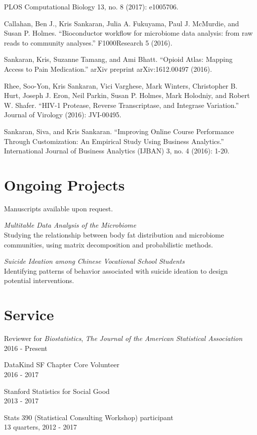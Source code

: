 \documentclass[letterpaper]{article}
\renewenvironment{itemize}{
  \begin{list}{}{
    \setlength{\leftmargin}{1.5em}
  }
}{
  \end{list}
}
\begin{document}
\begin{itemize}
\begin{itemize}
    PLOS Computational Biology 13, no. 8 (2017): e1005706.
  \item Callahan, Ben J., Kris Sankaran, Julia A. Fukuyama, Paul J. McMurdie, and
    Susan P. Holmes. ``Bioconductor workflow for microbiome data analysis: from
    raw reads to community analyses.'' F1000Research 5 (2016).
  \item Sankaran, Kris, Suzanne Tamang, and Ami Bhatt. ``Opioid Atlas: Mapping
    Access to Pain Medication.'' arXiv preprint arXiv:1612.00497 (2016).
  \item Rhee, Soo-Yon, Kris Sankaran, Vici Varghese, Mark Winters, Christopher B.
    Hurt, Joseph J. Eron, Neil Parkin, Susan P. Holmes, Mark Holodniy, and Robert
    W. Shafer. ``HIV-1 Protease, Reverse Transcriptase, and Integrase Variation.''
    Journal of Virology (2016): JVI-00495.
  \item Sankaran, Siva, and Kris Sankaran. ``Improving Online Course Performance
    Through Customization: An Empirical Study Using Business Analytics.''
    International Journal of Business Analytics (IJBAN) 3, no. 4 (2016): 1-20.
  \end{itemize}
\end{itemize}

\section*{Ongoing Projects}
Manuscripts available upon request.
\begin{itemize}
  \item \textit{Multitable Data Analysis of the Microbiome} \\
    Studying the relationship between body fat distribution and microbiome
    communities, using matrix decomposition and probabilistic methods.
  \item \textit{Suicide Ideation among Chinese Vocational School Students} \\
    Identifying patterns of behavior associated with suicide ideation to design
    potential interventions.
\end{itemize}

\section*{Service}

\begin{itemize}
\item Reviewer for \textit{Biostatistics}, \textit{The Journal of the American Statistical Association} \\
  2016 - Present
\item DataKind SF Chapter Core Volunteer \\
  2016 - 2017
\item Stanford Statistics for Social Good \\
  2013 - 2017
\item Stats 390 (Statistical Consulting Workshop) participant \\
  13 quarters, 2012 - 2017
\end{itemize}
\end{document}
